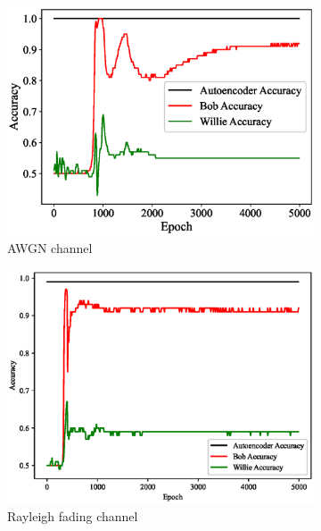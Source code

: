 \begin{figure}[tp!]
	\center
	\begin{subfigure}{0.24\textwidth}
		\includegraphics[width=\linewidth]{figs/training_progress_awgn}
		\caption{AWGN channel}
	\end{subfigure}
	\hfill
	\begin{subfigure}{0.24\textwidth}
		\includegraphics[width=\linewidth]{figs/training_progress_rayleigh}
		\caption{Rayleigh fading channel}	
	\end{subfigure}
	\begin{subfigure}{0.24\textwidth}

\end{subfigure}
\end{figure}
